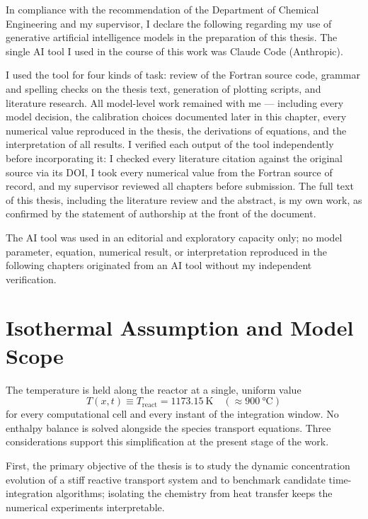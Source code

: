 In compliance with the recommendation of the Department of Chemical Engineering and my supervisor, I declare the following regarding my use of generative artificial intelligence models in the preparation of this thesis. The single AI tool I used in the course of this work was Claude Code (Anthropic).

I used the tool for four kinds of task: review of the Fortran source code, grammar and spelling checks on the thesis text, generation of plotting scripts, and literature research. All model-level work remained with me --- including every model decision, the calibration choices documented later in this chapter, every numerical value reproduced in the thesis, the derivations of equations, and the interpretation of all results. I verified each output of the tool independently before incorporating it: I checked every literature citation against the original source via its DOI, I took every numerical value from the Fortran source of record, and my supervisor reviewed all chapters before submission. The full text of this thesis, including the literature review and the abstract, is my own work, as confirmed by the statement of authorship at the front of the document.

The AI tool was used in an editorial and exploratory capacity only; no model parameter, equation, numerical result, or interpretation reproduced in the following chapters originated from an AI tool without my independent verification.

\section{Isothermal Assumption and Model Scope}\label{sec:isothermal}

The temperature is held along the reactor at a single, uniform value
%
\begin{equation}
  T(x,t) \equiv T_{\mathrm{react}} = \SI{1173.15}{\kelvin}
  \quad (\approx \SI{900}{\degreeCelsius})
  \label{eq:isothermal_T}
\end{equation}
%
for every computational cell and every instant of the integration window. No enthalpy balance is solved alongside the species transport equations. Three considerations support this simplification at the present stage of the work. 

First, the primary objective of the thesis is to study the dynamic concentration evolution of a stiff reactive transport system and to benchmark candidate time-integration algorithms; isolating the chemistry from heat transfer keeps the numerical experiments interpretable. 

